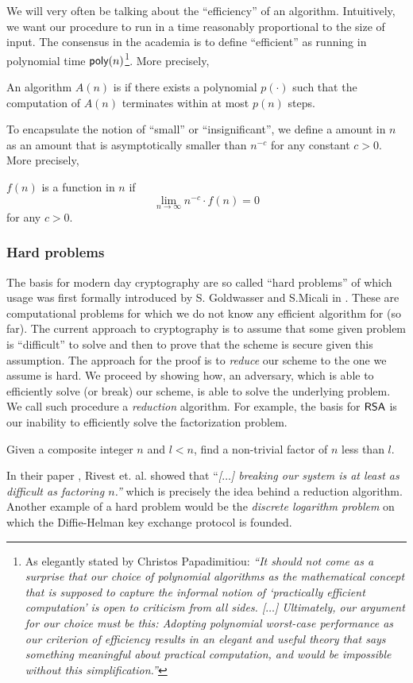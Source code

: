 We will very often be talking about the ``efficiency'' of an algorithm. Intuitively, we want our procedure to run in a time reasonably proportional to the size of input. The consensus in the academia is to define ``efficient'' as running in polynomial time $\textsf{poly}(n)$\footnote{As elegantly stated by Christos Papadimitiou: \textit{``It should not come as a surprise that our choice of polynomial algorithms as the mathematical concept that is supposed to capture the informal notion of ‘practically efficient computation’ is open to criticism from all sides. [$\ldots$] Ultimately, our argument for our choice must be this: Adopting polynomial worst-case performance as our criterion of efficiency results in an elegant and useful theory that says something meaningful about practical computation, and would be impossible without this simplification.''}}. More precisely, 
\begin{definition}
	An algorithm $A(n)$ is  if there exists a polynomial $p(\cdot)$ such that the computation of $A(n)$ terminates within at most $p(n)$ steps.
\end{definition}
To encapsulate the notion of ``small'' or ``insignificant'', we define a  amount in $n$ as an amount that is asymptotically smaller than $n^{-c}$ for any constant $c > 0$. More precisely, 
\begin{definition}\label{negl}
    $f (n)$ is a  function in $n$ if 
	\[\lim_{n \to \infty}n^{-c} \cdot f (n) = 0\]
	for any $c > 0$.
\end{definition}

\subsubsection*{Hard problems}
The basis for modern day cryptography are so called ``hard problems'' of which usage was first formally introduced by S. Goldwasser and S.Micali in \cite{prob-cryp}. These are computational problems for which we do not know any efficient algorithm for (so far). The current approach to cryptography is to assume that some given problem is ``difficult'' to solve and then to prove that the scheme is secure given this assumption. The approach for the proof is to \textit{reduce} our scheme to the one we assume is hard. We proceed by showing how, an adversary, which is able to efficiently solve (or break) our scheme, is able to solve the underlying problem. We call such procedure a \textit{reduction} algorithm. For example, the basis for $\textsf{RSA}$ is our inability to efficiently solve the factorization problem.
\begin{definition}
	Given a composite integer $n$ and $l < n$, find a non-trivial factor of $n$ less than $l$.
\end{definition}
In their paper \cite{rsa}, Rivest et. al. showed that ``\textit{[$\ldots$] breaking our system is at least as difficult as factoring $n$.''} which is precisely the idea behind a reduction algorithm. Another example of a hard problem would be the \textit{discrete logarithm problem} on which the Diffie-Helman key exchange protocol is founded.

